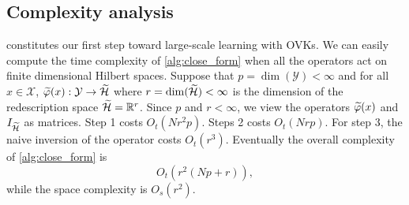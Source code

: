 \subsection{Complexity analysis}
\label{subsec:complexity}
 constitutes our first step toward large-scale learning
with \aclp{OVK}. We can easily compute the time complexity of
\cref{alg:close_form} when all the operators act on finite dimensional Hilbert
spaces. Suppose that $p=\dim(\mathcal{Y})<\infty$ and for all $x\in\mathcal{X}$,
$\tildePhi{\omega}(x):\mathcal{Y}\to\tildeH{\omega}$ where
$r=\dim(\widetilde{\mathcal{H}})<\infty$ is the dimension of the redescription space
$\widetilde{\mathcal{H}}=\mathbb{R}^{r}$. Since $p$ and $r<\infty$, we view the
operators $\tildePhi{\omega}(x)$ and $I_{\widetilde{\mathcal{H}}}$ as matrices.  Step 1
costs $O_t(Nr^2p)$. Steps 2 costs $O_t(Nrp)$. For step 3, the naive inversion
of the operator costs $O_t(r^3)$. Eventually the overall complexity of
\cref{alg:close_form} is
\begin{dmath*}
    O_t\left(r^2(Np + r)\right),
\end{dmath*}
while the space complexity is $O_s(r^2)$.
